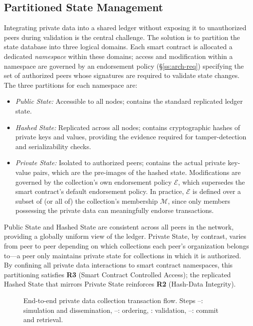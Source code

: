 \subsection{Partitioned State Management}
Integrating private data into a shared ledger without exposing it to unauthorized peers during validation is the central challenge. The solution is to partition the state database into three logical domains. Each smart contract is allocated a dedicated \textit{namespace} within these domains; access and modification within a namespace are governed by an endorsement policy (\S\ref{ss:arch-req}) specifying the set of authorized peers whose signatures are required to validate state changes. The three partitions for each namespace are:
\begin{itemize}[topsep=0pt,noitemsep,leftmargin=15pt]
    \item \textit{Public State:} Accessible to all nodes; contains the standard replicated ledger state.
    \item \textit{Hashed State:} Replicated across all nodes; contains cryptographic hashes of private keys and values, providing the evidence required for tamper-detection and serializability checks.
    \item \textit{Private State:} Isolated to authorized peers; contains the actual private key-value pairs, which are the pre-images of the hashed state. Modifications are governed by
      the collection's own endorsement policy $\mathcal{E}$, which supersedes the smart contract's default endorsement policy. In practice, $\mathcal{E}$ is defined over a subset of (or all of) the collection's membership $\mathcal{M}$, since only members possessing the private data can meaningfully endorse transactions.
\end{itemize}
Public State and Hashed State are consistent across all peers in the network, providing a globally uniform view of the ledger. Private State, by contrast, varies from peer to peer depending on which collections each peer's organization belongs to---a peer only maintains private state for collections in which it is authorized. By confining all private data interactions to smart contract namespaces, this partitioning satisfies \textbf{R3} (Smart Contract Controlled Access); the replicated Hashed State that mirrors Private State reinforces \textbf{R2} (Hash-Data Integrity).
\begin{figure}[t]
\centering
\small
\resizebox{\columnwidth}{!}{}
\caption{End-to-end private data collection transaction flow. Steps \protect{}--\protect{}: simulation and dissemination, \protect{}--\protect{}: ordering, \protect{}: validation, \protect{}--\protect{}: commit and retrieval.}
\label{fig:pdc-flow}
  \vspace{-0.2cm}
\end{figure}

